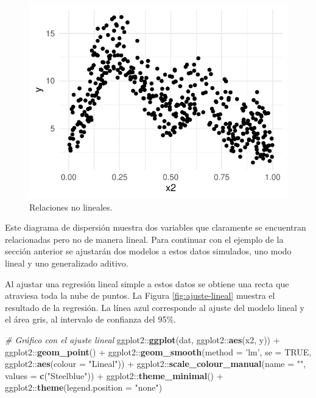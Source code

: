 \documentclass[
  12pt]{article}
\newenvironment{Shaded}{}{}
\newcommand{\CommentTok}[1]{\textcolor[rgb]{0.38,0.63,0.69}{\textit{#1}}}
\newcommand{\DataTypeTok}[1]{\textcolor[rgb]{0.56,0.13,0.00}{#1}}
\newcommand{\KeywordTok}[1]{\textcolor[rgb]{0.00,0.44,0.13}{\textbf{#1}}}
\newcommand{\NormalTok}[1]{#1}
\newcommand{\OperatorTok}[1]{\textcolor[rgb]{0.40,0.40,0.40}{#1}}
\newcommand{\OtherTok}[1]{\textcolor[rgb]{0.00,0.44,0.13}{#1}}
\newcommand{\StringTok}[1]{\textcolor[rgb]{0.25,0.44,0.63}{#1}}
\begin{document}
\begin{figure}[H]

{\centering \includegraphics{Manual_Generador_files/figure-latex/relaciones-no-lineales-1} 

}

\caption{Relaciones no lineales.}\label{fig:relaciones-no-lineales}
\end{figure}

Este diagrama de dispersión muestra dos variables que claramente se encuentran relacionadas pero no de manera lineal. Para continuar con el ejemplo de la sección anterior se ajustarán dos modelos a estos datos simulados, uno modo lineal y uno generalizado aditivo.

Al ajustar una regresión lineal simple a estos datos se obtiene una recta que atraviesa toda la nube de puntos. La Figura \ref{fig:ajuste-lineal} muestra el resultado de la regresión. La línea azul corresponde al ajuste del modelo lineal y el área gris, al intervalo de confianza del 95\%.

\begin{Shaded}
\begin{Highlighting}[]
\CommentTok{# Gráfico con el ajuste lineal}
\NormalTok{ggplot2}\OperatorTok{::}\KeywordTok{ggplot}\NormalTok{(dat, ggplot2}\OperatorTok{::}\KeywordTok{aes}\NormalTok{(x2, y)) }\OperatorTok{+}\StringTok{ }
\StringTok{  }\NormalTok{ggplot2}\OperatorTok{::}\KeywordTok{geom_point}\NormalTok{() }\OperatorTok{+}
\StringTok{  }\NormalTok{ggplot2}\OperatorTok{::}\KeywordTok{geom_smooth}\NormalTok{(}\DataTypeTok{method =} \StringTok{'lm'}\NormalTok{, }\DataTypeTok{se =} \OtherTok{TRUE}\NormalTok{, ggplot2}\OperatorTok{::}\KeywordTok{aes}\NormalTok{(}\DataTypeTok{colour =} \StringTok{"Lineal"}\NormalTok{)) }\OperatorTok{+}
\StringTok{  }\NormalTok{ggplot2}\OperatorTok{::}\KeywordTok{scale_colour_manual}\NormalTok{(}\DataTypeTok{name =} \StringTok{""}\NormalTok{, }\DataTypeTok{values =} \KeywordTok{c}\NormalTok{(}\StringTok{"Steelblue"}\NormalTok{)) }\OperatorTok{+}
\StringTok{  }\NormalTok{ggplot2}\OperatorTok{::}\KeywordTok{theme_minimal}\NormalTok{() }\OperatorTok{+}
\StringTok{  }\NormalTok{ggplot2}\OperatorTok{::}\KeywordTok{theme}\NormalTok{(}\DataTypeTok{legend.position =} \StringTok{"none"}\NormalTok{)}
\end{Highlighting}
\end{Shaded}
\end{document}
